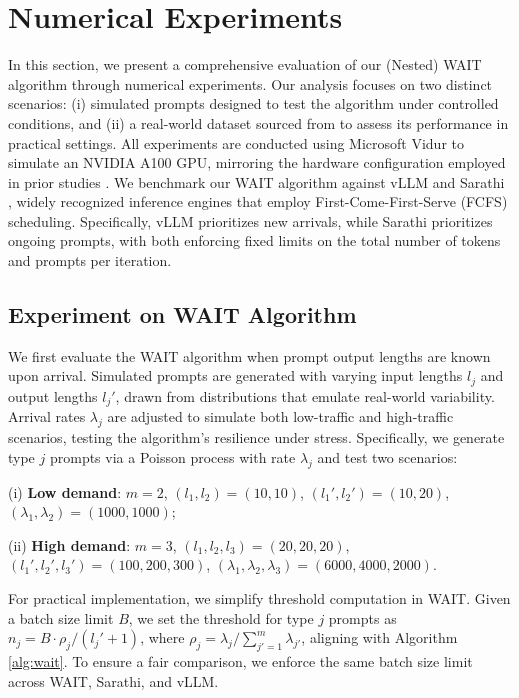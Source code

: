 \section{Numerical Experiments}
\label{sec:experiments}

In this section, we present a comprehensive evaluation of our (Nested) WAIT algorithm through numerical experiments. Our analysis focuses on two distinct scenarios: (i) simulated prompts designed to test the algorithm under controlled conditions, and (ii) a real-world dataset sourced from \cite{zheng2023lmsys} to assess its performance in practical settings. All experiments are conducted using Microsoft Vidur to simulate an NVIDIA A100 GPU, mirroring the hardware configuration employed in prior studies \citep{agrawal2024vidur}. We benchmark our WAIT algorithm against vLLM \citep{kwon2023efficient} and Sarathi \citep{agrawal2023sarathi}, widely recognized inference engines that employ First-Come-First-Serve (FCFS) scheduling. Specifically, vLLM prioritizes new arrivals, while Sarathi prioritizes ongoing prompts, with both enforcing fixed limits on the total number of tokens and prompts per iteration.

\subsection{Experiment on WAIT Algorithm}
We first evaluate the WAIT algorithm when prompt output lengths are known upon arrival. Simulated prompts are generated with varying input lengths \( l_j \) and output lengths \( l_j' \), drawn from distributions that emulate real-world variability. Arrival rates \( \lambda_j \) are adjusted to simulate both low-traffic and high-traffic scenarios, testing the algorithm's resilience under stress. Specifically, we generate type \( j \) prompts via a Poisson process with rate \( \lambda_j \) and test two scenarios:

(i) \textbf{Low demand}: \( m=2 \), \( (l_1, l_2) = (10, 10) \), \( (l_1', l_2') = (10, 20) \), \( (\lambda_1, \lambda_2) = (1000, 1000) \);  

(ii) \textbf{High demand}: \( m=3 \), \( (l_1, l_2, l_3) = (20, 20, 20) \), \( (l_1', l_2', l_3') = (100, 200, 300) \), \( (\lambda_1, \lambda_2, \lambda_3) = (6000, 4000, 2000) \).

For practical implementation, we simplify threshold computation in WAIT. Given a batch size limit \( B \), we set the threshold for type \( j \) prompts as \( n_j = B \cdot \rho_j / (l_j' + 1) \), where \( \rho_j = \lambda_j / \sum_{j'=1}^m \lambda_{j'} \), aligning with Algorithm \ref{alg:wait}. To ensure a fair comparison, we enforce the same batch size limit across WAIT, Sarathi, and vLLM.

